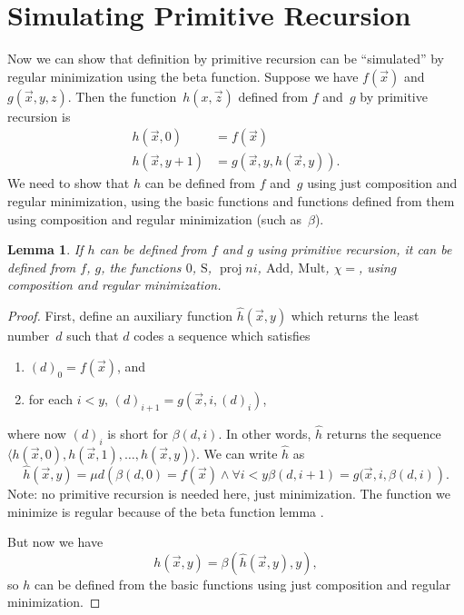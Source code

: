 \documentclass[10pt,a4paper]{article}
\makeatletter
\theoremstyle{plain}
\newtheorem{lem}[thm]{Lemma}
\theoremstyle{definition}
\theoremstyle{remark}
\newcommand*{\olfileid}[3]{}
\newcommand*{\olsection}[1]{\section*{#1}}
\newcommand*{\ollabel}[1]{\label{#1}}
\newcommand{\olref}{\@ifnextchar[{\olref@i}{\olref@final}}
\def\olref@i[#1]{\@ifnextchar[{\olref@ii}{\olref@final}}
\def\olref@ii[#1]{\@ifnextchar[{\olref@iii}{\olref@final}}
\def\olref@iii[#1]{\olref@final}
\def\olref@final#1{\ref{#1}}
\providecommand{\tuple}[1]{\langle #1 \rangle}
\providecommand{\Mult}{\ensuremath{\mathrm{Mult}}}
\providecommand{\Add}{\ensuremath{\mathrm{Add}}}
\providecommand{\Zero}{\ensuremath{0}}
\providecommand{\Succ}{\ensuremath{\mathrm{S}}}
\providecommand{\Char}{\chi}
\providecommand{\Proj}{\operatorname{proj}}
\providecommand{\bforall}{\forall}
\providecommand{\umin}{\mu}
\makeatother
\begin{document}
\olfileid{inc}{req}{pri}
\olsection{Simulating Primitive Recursion}

Now we can show that definition by primitive recursion can be
``simulated'' by regular minimization using the beta function. Suppose
we have $f(\vec x)$ and $g(\vec x, y, z)$. Then the function~$h(x,\vec
z)$ defined from $f$ and~$g$ by primitive recursion is
\begin{align*}
h(\vec x, 0) & =  f(\vec x) \\
h(\vec x, y+1) & =  g(\vec x, y, h(\vec x, y)).
\end{align*}
We need to show that $h$ can be defined from $f$ and~$g$ using just
composition and regular minimization, using the basic functions and
functions defined from them using composition and regular minimization
(such as~$\beta$).

\begin{lem}
\ollabel{lem:prim-rec}
If $h$ can be defined from $f$ and $g$ using primitive recursion, it
can be defined from $f$, $g$, the functions $\Zero$, $\Succ$,
$\Proj{n}{i}$, $\Add$, $\Mult$, $\Char{=}$, using composition and
regular minimization.
\end{lem}

\begin{proof}
First, define an auxiliary function $\hat h(\vec x, y)$ which returns
the least number~$d$ such that $d$ codes a sequence which satisfies
\begin{enumerate}
\item $(d)_0 = f(\vec x)$, and
\item for each $i < y$, $(d)_{i+1} = g(\vec x, i, (d)_i)$,
\end{enumerate}
where now $(d)_i$ is short for $\beta(d,i)$. In other words, $\hat h$
returns the sequence $\tuple{h(\vec x, 0), h(\vec x, 1), \dots, h(\vec
x, y)}$. We can write $\hat h$ as
\[
\hat h(\vec x, y) = \umin{d}{(\beta(d,0) = f(\vec x) \land \bforall{i <
  y}{\beta(d,i+1) = g(\vec x, i,\beta(d,i)})}.
\]
Note: no primitive recursion is needed here, just minimization. The
function we minimize is regular because of the beta function lemma
\olref[bet]{lem:beta}.

But now we have
\[
h(\vec x, y) = \beta(\hat h(\vec x, y), y),
\]
so $h$ can be defined from the basic functions using just composition
and regular minimization.
\end{proof}


\end{document}
